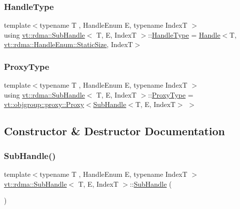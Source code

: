\subsubsection{\texorpdfstring{Handle\+Type}{HandleType}}
{\footnotesize\ttfamily template$<$typename T , Handle\+Enum E, typename IndexT $>$ \\
using \hyperlink{structvt_1_1rdma_1_1_sub_handle}{vt\+::rdma\+::\+Sub\+Handle}$<$ T, E, IndexT $>$\+::\hyperlink{structvt_1_1rdma_1_1_sub_handle_a782bd6ddc85c6a81d7f55d207fad71cd}{Handle\+Type} =  \hyperlink{structvt_1_1rdma_1_1_handle}{Handle}$<$T, \hyperlink{namespacevt_1_1rdma_a0234ff19cfb3c04718cfdfd36b2d6d88a0c5c41d6a0319a61d3a5e8a060b7c4d7}{vt\+::rdma\+::\+Handle\+Enum\+::\+Static\+Size}, IndexT$>$}

\mbox{\label{structvt_1_1rdma_1_1_sub_handle_a758bee2e499658cfef92ace83eea6590}} 
\subsubsection{\texorpdfstring{Proxy\+Type}{ProxyType}}
{\footnotesize\ttfamily template$<$typename T , Handle\+Enum E, typename IndexT $>$ \\
using \hyperlink{structvt_1_1rdma_1_1_sub_handle}{vt\+::rdma\+::\+Sub\+Handle}$<$ T, E, IndexT $>$\+::\hyperlink{structvt_1_1rdma_1_1_sub_handle_a758bee2e499658cfef92ace83eea6590}{Proxy\+Type} =  \hyperlink{structvt_1_1objgroup_1_1proxy_1_1_proxy}{vt\+::objgroup\+::proxy\+::\+Proxy}$<$\hyperlink{structvt_1_1rdma_1_1_sub_handle}{Sub\+Handle}$<$T, E, IndexT$>$ $>$}



\subsection{Constructor \& Destructor Documentation}
\mbox{\label{structvt_1_1rdma_1_1_sub_handle_a451c1375245f317a93fef612e1954c96}} 
\subsubsection{\texorpdfstring{Sub\+Handle()}{SubHandle()}}
{\footnotesize\ttfamily template$<$typename T , Handle\+Enum E, typename IndexT $>$ \\
\hyperlink{structvt_1_1rdma_1_1_sub_handle}{vt\+::rdma\+::\+Sub\+Handle}$<$ T, E, IndexT $>$\+::\hyperlink{structvt_1_1rdma_1_1_sub_handle}{Sub\+Handle} (\begin{DoxyParamCaption}{ }\end{DoxyParamCaption})\hspace{0.3cm}{\ttfamily [default]}}



